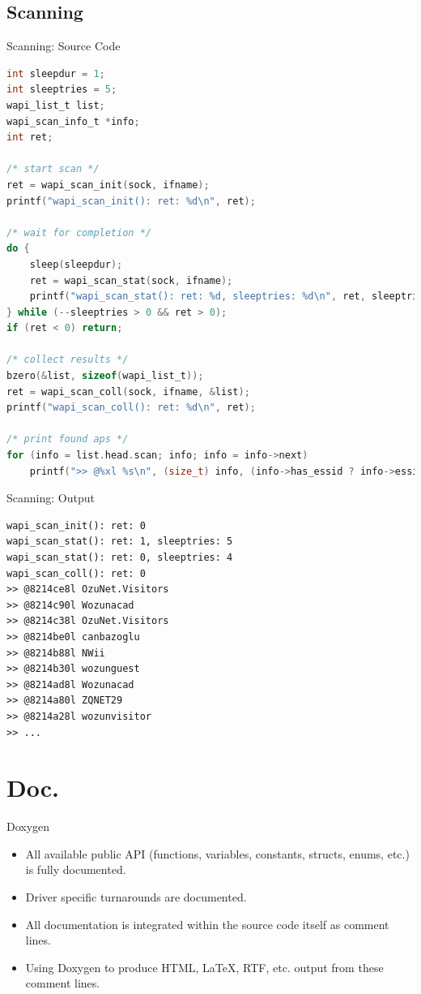 \documentclass[turkish,12pt,red,compress,mathserif]{beamer}
\begin{document}

\subsection{Scanning}

\begin{frame}[fragile]{Scanning: Source Code}
  \begin{lstlisting}[language=c]
int sleepdur = 1;
int sleeptries = 5;
wapi_list_t list;
wapi_scan_info_t *info;
int ret;

/* start scan */
ret = wapi_scan_init(sock, ifname);
printf("wapi_scan_init(): ret: %d\n", ret);

/* wait for completion */
do {
    sleep(sleepdur);
    ret = wapi_scan_stat(sock, ifname);
    printf("wapi_scan_stat(): ret: %d, sleeptries: %d\n", ret, sleeptries);
} while (--sleeptries > 0 && ret > 0);
if (ret < 0) return;

/* collect results */
bzero(&list, sizeof(wapi_list_t));
ret = wapi_scan_coll(sock, ifname, &list);
printf("wapi_scan_coll(): ret: %d\n", ret);

/* print found aps */
for (info = list.head.scan; info; info = info->next)
    printf(">> @%xl %s\n", (size_t) info, (info->has_essid ? info->essid : ""));
  \end{lstlisting}
\end{frame}

\begin{frame}[fragile]{Scanning: Output}
  \begin{lstlisting}
wapi_scan_init(): ret: 0
wapi_scan_stat(): ret: 1, sleeptries: 5
wapi_scan_stat(): ret: 0, sleeptries: 4
wapi_scan_coll(): ret: 0
>> @8214ce8l OzuNet.Visitors
>> @8214c90l Wozunacad
>> @8214c38l OzuNet.Visitors
>> @8214be0l canbazoglu
>> @8214b88l NWii
>> @8214b30l wozunguest
>> @8214ad8l Wozunacad
>> @8214a80l ZQNET29
>> @8214a28l wozunvisitor
>> ...
  \end{lstlisting}
\end{frame}


\section{Doc.}

\begin{frame}{Doxygen}
  \begin{itemize}
  \item All available public API (functions, variables, constants, structs,
    enums, etc.) is fully documented.
  \item Driver specific turnarounds are documented.
  \item All documentation is integrated within the source code itself as comment
    lines.
  \item Using Doxygen to produce HTML, LaTeX, RTF, etc. output from these
    comment lines.
  \end{itemize}
\end{frame}
\end{document}
